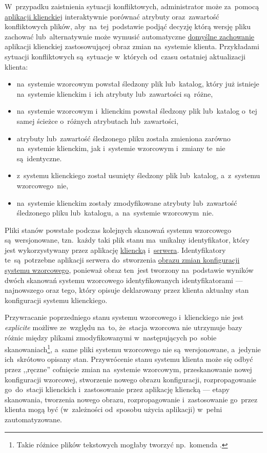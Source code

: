 \documentclass[thesis]{subfiles}
\begin{document}
W~przypadku zaistnienia sytuacji konfliktowych, administrator może za~pomocą \hyperref[sec:cli-app]{aplikacji klienckiej} interaktywnie porównać atrybuty oraz~zawartość konfliktowych plików, aby~na~tej~podstawie podjąć decyzję którą wersję pliku zachować lub~alternatywnie może wymusić automatyczne \hyperlink{itm:cli-force}{domyślne zachowanie} aplikacji klienckiej zastosowującej obraz zmian na~systemie klienta. Przykładami sytuacji konfliktowych są~sytuacje w~których od~czasu ostatniej aktualizacji klienta:
\begin{itemize}
	\item na~systemie wzorcowym powstał śledzony plik lub~katalog, który już istnieje na~systemie klienckim i~ich atrybuty lub~zawartości są~różne,
	\item na~systemie wzorcowym i~klienckim powstał śledzony plik lub~katalog o~tej samej ścieżce o~różnych atrybutach lub~zawartości,
	\item atrybuty lub~zawartość śledzonego pliku została zmieniona zarówno na~systemie klienckim, jak i~systemie wzorcowym i~zmiany te~nie są~identyczne.
	\item z~systemu klienckiego został usunięty śledzony plik lub~katalog, a~z~systemu wzorcowego~nie,
	\item na~systemie klienckim zostały zmodyfikowane atrybuty lub~zawartość śledzonego pliku lub~katalogu, a~na~systemie wzorcowym~nie.
\end{itemize}

Pliki stanów powstałe podczas kolejnych skanowań systemu wzorcowego są~wersjonowane, tzn.~każdy taki plik stanu ma~unikalny identyfikator, który jest wykorzystywany przez aplikację \hyperref[sec:cli-app]{kliencką} i~\hyperref[sec:srv-app]{serwera}. Identyfikatory te~są~potrzebne aplikacji serwera do~stworzenia \hyperref[sec:obraz-zmian-konfiguracji]{obrazu zmian konfiguracji systemu wzorcowego}, ponieważ obraz ten~jest tworzony na~podstawie wyników dwóch skanowań systemu wzorcowego identyfikowanych identyfikatorami --- najnowszego oraz tego, który opisuje deklarowany przez klienta aktualny stan konfiguracji systemu klienckiego.

Przywracanie poprzedniego stanu systemu wzorcowego i~klienckiego nie jest \emph{explicite} możliwe ze~względu na~to, że~stacja wzorcowa nie utrzymuje bazy różnic między plikami zmodyfikowanymi w~następujących po~sobie skanowaniach\footnote{Takie różnice plików tekstowych mogłaby tworzyć np.~komenda .}, a~same pliki systemu wzorcowego nie są~wersjonowane, a~jedynie ich~skrótowo opisany stan. Przywrócenie stanu systemu klienta może się odbyć przez ,,ręczne'' cofnięcie zmian na~systemie wzorcowym, przeskanowanie nowej konfiguracji wzorcowej, stworzenie nowego obrazu konfiguracji, rozpropagowanie go~do~stacji klienckich i~zastosowanie przez aplikację kliencką --- etapy skanowania, tworzenia nowego obrazu, rozpropagowanie i~zastosowanie go~przez klienta mogą być (w~zależności od~sposobu użycia aplikacji) w~pełni zautomatyzowane.
\end{document}

